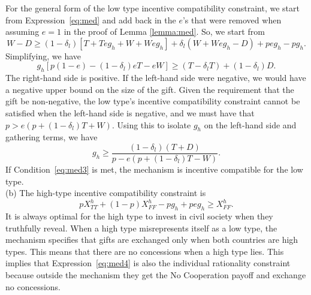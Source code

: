 \documentclass[bibtex,autowc]{apsr_submission}
\newcommand{\de}{\delta}
\begin{document}
{For the general form of the low type incentive compatibility constraint, we start from Expression~\ref{eq:med} and add back in the $e$'s that were removed when assuming $e=1$ in the proof of Lemma \ref{lemma:med}. So, we start from
\begin{equation*}
			W-D \geq 
			\left(1-\de_l\right) \left[T + Teg_h + W + Weg_h \right] + \de_l \left(W + Weg_h -D \right) + peg_h - pg_h.
		\end{equation*}
Simplifying, we have
\[
	g_h\left[p\left(1 - e\right) -(1-\de_l)eT -eW \right] \geq \left(T - \de_l T \right) + \left(1 - \de_l \right) D.
\]
The right-hand side is positive. If the left-hand side were negative, we would have a negative upper bound on the size of the gift. Given the requirement that the gift be non-negative, the low type's incentive compatibility constraint cannot be satisfied when the left-hand side is negative, and we must have that $p > e\left(p+\left(1-\de_l\right)T + W\right)$. Using this to isolate $g_h$ on the left-hand side and gathering terms, we have 
\begin{equation}
	g_h \geq \frac{\left(1 - \de_l \right)\left(T +D \right)}{p - e\left(p +(1-\de_l)T -W \right)}.
	\label{eq:med3}
\end{equation}
If Condition~\ref{eq:med3} is met, the mechanism is incentive compatible for the low type.\\
(b) The high-type incentive compatibility constraint is
\begin{equation}
	pX_{TT}^h+(1-p)X_{FF}^h - pg_h +peg_h \geq X_{FF}^h .
	\label{eq:med4}
\end{equation}
It is always optimal for the high type to invest in civil society when they truthfully reveal. When a high type misrepresents itself as a low type, the mechanism specifies that gifts are exchanged only when both countries are high types. This means that there are no concessions when a high type lies. This implies that Expression~\ref{eq:med4} is also the individual rationality constraint because outside the mechanism they get the No Cooperation payoff and exchange no concessions.

}
\end{document}
